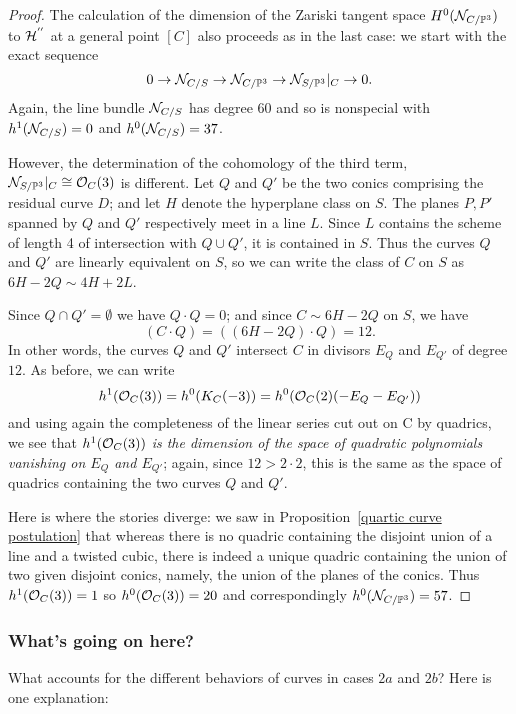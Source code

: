 \begin{proof}
The calculation of the dimension of the Zariski tangent space $H^0({\mathcal N}_{C/{\mathbb P}^3})$ to $ \cal H^{''}$ at a general point $[C]$ also proceeds as in the last case: we start with the exact sequence
$$
0 \to {\mathcal N}_{C/S} \to {\mathcal N}_{C/{\mathbb P}^3} \to {\mathcal N}_{S/{\mathbb P}^3}|_C \to 0.
$$ 
Again, the line bundle ${\mathcal N}_{C/S}$ has degree 60 and so is nonspecial with $h^1({\mathcal N}_{C/S}) = 0$ and $h^0({\mathcal N}_{C/S}) = 37$.

However, the determination of the cohomology of the third term, ${\mathcal N}_{S/{\mathbb P}^3}|_C \cong {\mathcal O}_C(3)$ is different. Let $Q$ and $Q'$ be the  two conics comprising the residual curve $D$; and let $H$ denote the hyperplane class on $S$. The planes $P,P'$ spanned by $Q$ and $Q'$ respectively meet in a line $L$. Since $L$ contains the scheme of length 4 of intersection with $Q\cup Q'$, it is contained in $S$. Thus the curves $Q$ and $Q'$ are linearly equivalent on $S$, so we can write the class of $C$ on $S$ as $6H-2Q \sim 4H+2L$.

Since $Q\cap Q' = \emptyset$ we have  $Q \cdot Q = 0$; and since $C \sim 6H - 2Q$ on $S$, we have
$$
(C\cdot Q) = ((6H - 2Q) \cdot Q) = 12.
$$
In other words, the curves $Q$ and $Q'$ intersect $C$ in divisors $E_Q$ and $E_{Q'}$ of degree $12$. As before, we can write
$$
h^1({\mathcal O}_C(3)) = h^0(K_C(-3)) = h^0({\mathcal O}_C(2)(-E_Q-E_{Q'}))
$$
and using again the completeness of the linear series cut out on C by quadrics, we see that \emph{$h^1({\mathcal O}_C(3))$ is the dimension of the space of quadratic polynomials vanishing on $E_Q$ and $E_{Q'}$}; again, since $12 > 2\cdot 2$, this is the same as the space of quadrics containing the two curves $Q$ and $Q'$. 

Here is where the stories diverge: we saw in Proposition~\ref{quartic curve postulation} that whereas there is no quadric containing the disjoint union of a line and a twisted cubic, there is indeed a unique quadric containing the union of two given disjoint conics, namely, the union of the planes of the conics.  
Thus $h^1({\mathcal O}_C(3))=1$ so  $h^0({\mathcal O}_C(3)) = 20$ and correspondingly $h^0({\mathcal N}_{C/{\mathbb P}^3}) = 57$.
\end{proof}



\subsubsection{What's going on here?}

What accounts for the different behaviors of curves in cases $2a$ and $2b$? Here is one explanation:

